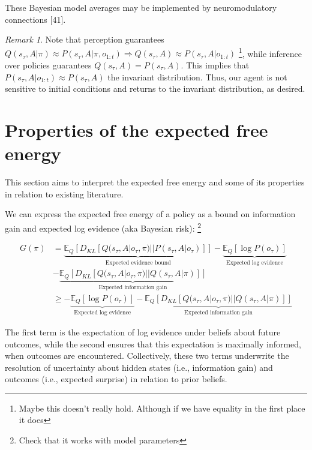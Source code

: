 \documentclass{article}
\theoremstyle{plain}
\theoremstyle{definition}
\theoremstyle{proposition}
\theoremstyle{corollary}
\theoremstyle{lemma}
\theoremstyle{remark}
\newtheorem{rem}[thm]{Remark}
\theoremstyle{example}
\begin{document}
These Bayesian model averages may be implemented by neuromodulatory connections [41].

\begin{rem}
Note that perception guarantees $Q(s_\tau, A | \pi ) \approx P(s_\tau, A | \pi , o_{1:t}) \Rightarrow Q(s_\tau, A ) \approx P(s_\tau, A | o_{1:t})$ \footnote{Maybe this doesn't really hold. Although if we have equality in the first place it does}, while inference over policies guarantees $Q(s_\tau, A) = P(s_\tau, A)$. This implies that $P(s_\tau, A | o_{1:t}) \approx P(s_\tau, A)$ the invariant distribution. Thus, our agent is not sensitive to initial conditions and returns to the invariant distribution, as desired.
\end{rem}


\section{Properties of the expected free energy}

This section aims to interpret the expected free energy and some of its properties in relation to existing literature.

We can express the expected free energy of a policy as a bound on information gain and expected log evidence (aka Bayesian risk): \footnote{Check that it works with model parameters}

\begin{equation}
    \begin{split}
        G(\pi)
        &= \underbrace{\mathbb E_Q[D_{KL}[Q(s_\tau, A|o_\tau, \pi)||P(s_\tau, A|o_\tau)]]}_{\text{Expected evidence bound}}- \underbrace{\mathbb E_Q[\log P(o_\tau)]}_{\text{Expected log evidence}} \\
        &- \underbrace{\mathbb E_Q [D_{KL}[Q(s_\tau,A |o_\tau, \pi)||Q(s_\tau ,A|\pi)]]}_{\text{Expected information gain}} \\
        &\geq - \underbrace{\mathbb E_Q[\log P(o_\tau)]}_{\text{Expected log evidence}}- \underbrace{\mathbb E_Q [D_{KL}[Q(s_\tau,A |o_\tau, \pi)||Q(s_\tau,A |\pi)]]}_{\text{Expected information gain}} 
    \end{split}
\end{equation}

The first term is the expectation of log evidence under beliefs about future outcomes, while the second ensures that this expectation is maximally informed, when outcomes are encountered. Collectively, these two terms underwrite the resolution of uncertainty about hidden states (i.e., information gain) and outcomes (i.e., expected surprise) in relation to prior beliefs.
\end{document}
